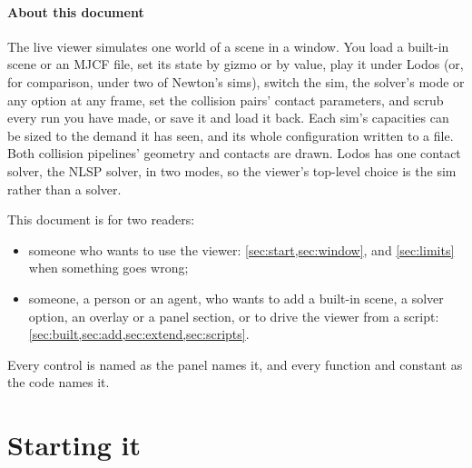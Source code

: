 



\paragraph{About this document}
The live viewer simulates one world of a scene in a window. You load a built-in scene or an MJCF file, set its state by gizmo or by value, play it under Lodos (or, for comparison, under two of Newton's sims), switch the sim, the solver's mode or any option at any frame, set the collision pairs' contact parameters, and scrub every run you have made, or save it and load it back. Each sim's capacities can be sized to the demand it has seen, and its whole configuration written to a file. Both collision pipelines' geometry and contacts are drawn. Lodos has one contact solver, the NLSP solver, in two modes, so the viewer's top-level choice is the sim rather than a solver.

This document is for two readers:

\begin{itemize}
\item someone who wants to use the viewer: \cref{sec:start,sec:window}, and \cref{sec:limits} when something goes wrong;
\item someone, a person or an agent, who wants to add a built-in scene, a solver option, an overlay or a panel section, or to drive the viewer from a script: \cref{sec:built,sec:add,sec:extend,sec:scripts}.
\end{itemize}

Every control is named as the panel names it, and every function and constant as the code names it.

\setcounter{tocdepth}{2}
\tableofcontents

\section{Starting it}\label{sec:start}

